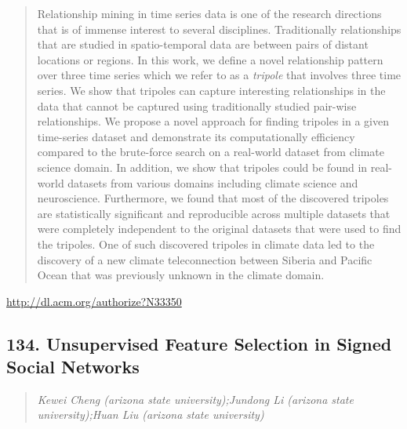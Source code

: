 \documentclass{article}
\begin{document}
\begin{quote}
Relationship mining in time series data is one of the research directions that is of immense interest to several disciplines. Traditionally relationships that are studied in spatio-temporal data are between pairs of distant locations or regions. In this work, we define a novel relationship pattern over three time series which we refer to as a \textit{tripole} that involves three time series. We show that tripoles can capture interesting relationships in the data that cannot be captured using traditionally studied pair-wise relationships. We propose a novel approach for finding tripoles in a given time-series dataset and demonstrate its computationally efficiency compared to the brute-force search on a real-world dataset from climate science domain. In addition, we show that tripoles could be found in real-world datasets from various domains including climate science and neuroscience. Furthermore, we found that most of the discovered tripoles are statistically significant and reproducible across multiple datasets that were completely independent to the original datasets that were used to find the tripoles. One of such discovered tripoles in climate data led to the discovery of a new climate teleconnection between Siberia and Pacific Ocean that was previously unknown in the climate domain.
\end{quote}

\href{http://dl.acm.org/authorize?N33350}{http://dl.acm.org/authorize?N33350}

\subsection{134. Unsupervised Feature Selection in Signed Social Networks}

\begin{quote}
\footnotesize{\textit{Kewei Cheng (arizona state university);Jundong Li (arizona state university);Huan Liu (arizona state university)}}

\end{quote}
\end{document}
